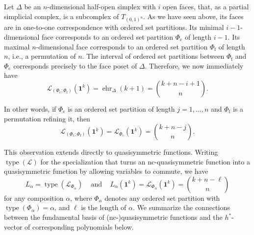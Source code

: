 \documentclass[12pt,reqno]{amsart}
\numberwithin{definition}{section}
\theoremstyle{definition}
\newcommand{\ehr}{\operatorname{ehr}}
\newcommand{\type}{\operatorname{type}}
\newcommand{\ncL}{\mathcal{L}}
\newcommand{\T}{T} %
\newcommand{\TC}{\T_{(0,1)^n}} %
\begin{document}
Let $\Delta$ be an $n$-dimensional half-open simplex with $i$ open faces, that, as a partial simplicial complex, is a subcomplex of $\TC$. As we have seen above, its faces are in one-to-one correspondence with ordered set partitions. Its minimal $i-1$-dimensional face corresponds to an ordered set partition $\Phi_\text{c}$ of length $i-1$. Its maximal $n$-dimensional face corresponds to an ordered set partition $\Phi_\text{f}$ of length $n$, i.e., a permutation of $n$. The interval of ordered set partitions between $\Phi_\text{f}$ and $\Phi_\text{c}$ corresponds precisely to the face poset of $\Delta$. Therefore, we now immediately have
\[
  \ncL_{(\Phi_\text{c};\Phi_\text{f})}(\mathbf{1}^k) = \ehr_\Delta(k+1) = \binom{k+n-i+1}{n}.
\]

In other words, if $\Phi_{\text{c}}$ is an ordered set partition of length $j=1,\ldots,n$ and $\Phi_{\text{f}}$ is a permutation refining it, then 
\[
  \ncL_{(\Phi_\text{c};\Phi_\text{f})}(\mathbf{1}^k) = \ncL_{\Phi_\text{c}}(\mathbf{1}^k) = \binom{k+n-j}{n}.
\]

This observation extends directly to quasisymmetric functions. Writing $\type(\ncL)$
for the specialization that turns an nc-quasisymmetric function into a quasisymmetric function by allowing variables to commute, we have 
\[
  L_\alpha = \type(\ncL_{\Phi_\alpha}) \;\;\; \text{ and } \;\;\; L_\alpha(\mathbf{1}^k) = \ncL_{\Phi_\alpha}(\mathbf{1}^k) = \binom{k+n-\ell}{n}
\]
for any composition $\alpha$, where $\Phi_\alpha$ denotes any ordered set partition with $\operatorname{type}(\Phi_\alpha) = \alpha$, and $\ell$ is the length of $\alpha$.
We summarize the connections 
 between the fundamental basis of (nc-)quasisymmetric functions and the $h^*$-vector of corresponding polynomials below.
\end{document}
